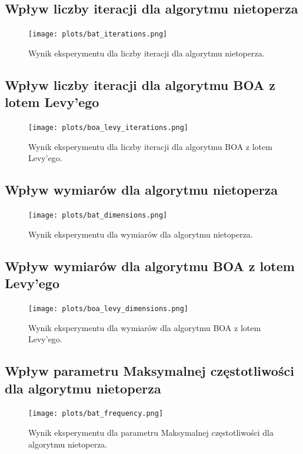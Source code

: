 \subsection{Wpływ liczby iteracji dla algorytmu nietoperza}

\begin{figure}[H]
\centering
\texttt{[image: plots/bat\_iterations.png]}
\caption{Wynik eksperymentu dla liczby iteracji dla algorytmu nietoperza.}
\label{fig:iterations_bat}
\end{figure}

\subsection{Wpływ liczby iteracji dla algorytmu BOA z lotem Levy’ego}

\begin{figure}[H]
\centering
\texttt{[image: plots/boa\_levy\_iterations.png]}
\caption{Wynik eksperymentu dla liczby iteracji dla algorytmu BOA z lotem Levy’ego.}
\label{fig:iterations_levy}
\end{figure}

\subsection{Wpływ wymiarów dla algorytmu nietoperza}

\begin{figure}[H]
\centering
\texttt{[image: plots/bat\_dimensions.png]}
\caption{Wynik eksperymentu dla wymiarów dla algorytmu nietoperza.}
\label{fig:dimensions_bat}
\end{figure}

\subsection{Wpływ wymiarów dla algorytmu BOA z lotem Levy’ego}

\begin{figure}[H]
\centering
\texttt{[image: plots/boa\_levy\_dimensions.png]}
\caption{Wynik eksperymentu dla wymiarów dla algorytmu BOA z lotem Levy’ego.}
\label{fig:dimensions_levy}
\end{figure}

\subsection{Wpływ parametru Maksymalnej częstotliwości dla algorytmu nietoperza}

\begin{figure}[H]
\centering
\texttt{[image: plots/bat\_frequency.png]}
\caption{Wynik eksperymentu dla parametru Maksymalnej częstotliwości dla algorytmu nietoperza.}
\label{fig:frequency_bat}
\end{figure}

